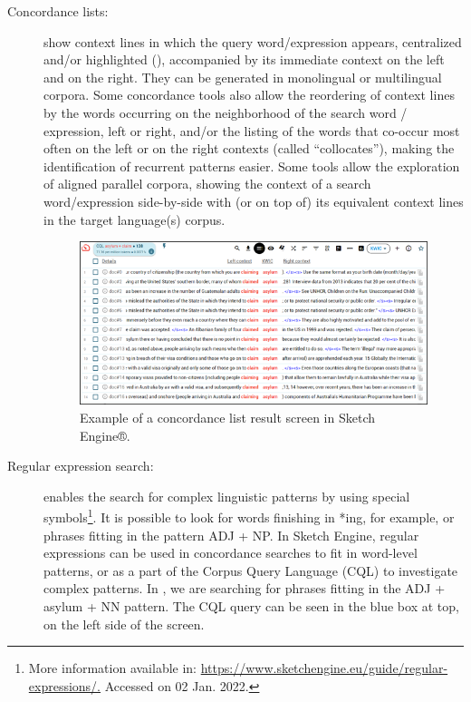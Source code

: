 \documentclass[english]{textolivre}
\begin{document}
\begin{description}
\item[Concordance lists:] show context lines in which the query word/expression appears, centralized and/or highlighted (), accompanied by its immediate context on the left and on the right. They can be generated in monolingual or multilingual corpora. Some concordance tools also allow the reordering of context lines by the words occurring on the neighborhood of the search word / expression, left or right, and/or the listing of the words that co-occur most often on the left or on the right contexts (called “collocates”), making the identification of recurrent patterns easier. Some tools allow the exploration of aligned parallel corpora, showing the context of a search word/expression side-by-side with (or on top of) its equivalent context lines in the target language(s) corpus.

\begin{figure}[htbp]
\centering
\includegraphics[width=\textwidth]{Figura01.png}
\caption{Example of a concordance list result screen in Sketch Engine®.}
\label{Figura01}
\end{figure}

\item[Regular expression search:] enables the search for complex linguistic patterns by using special symbols\footnote{More information available in: \url{https://www.sketchengine.eu/guide/regular-expressions/.} Accessed on 02 Jan. 2022.}. It is possible to look for words finishing in *ing, for example, or phrases fitting in the pattern ADJ + NP. In Sketch Engine, regular expressions can be used in concordance searches to fit in word-level patterns, or as a part of the Corpus Query Language (CQL) to investigate complex patterns. In , we are searching for phrases fitting in the ADJ + asylum + NN pattern. The CQL query can be seen in the blue box at top, on the left side of the screen.


\end{description}
\end{document}
